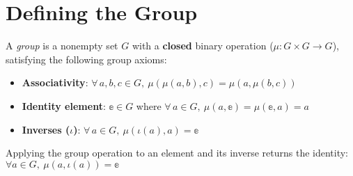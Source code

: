 \section{Defining the Group}

\begin{definition}[Group]
    \label{definition : Group}
    \leanok
    A \emph{group} is a nonempty set $G$ with a \textbf{closed} binary operation
    ($\mu : G \times G \rightarrow G$), satisfying the following group axioms:
    \begin{itemize}
        \item \textbf{Associativity}:
        $\forall \,a, b, c \in G, ~\mu(\mu(a, b), c) = \mu(a, \mu(b, c))$
        \item \textbf{Identity element}: $\mathbb{e}\in G$ where $\forall\,a
        \in G, ~\mu (a, \mathbb{e}) = \mu(\mathbb{e}, a) = a$
        \item \textbf{Inverses ($\iota$)}: $\forall\,a \in G, ~\mu(\iota(a), a)
        = \mathbb{e}$
    \end{itemize}
\end{definition}

\begin{theorem}
    \label{theorem : op_inv}
    \leanok
    Applying the group operation to an element and its inverse returns the
    identity: $\forall a \in G, ~\mu(a, \iota(a)) = \mathbb{e}$
\end{theorem}
